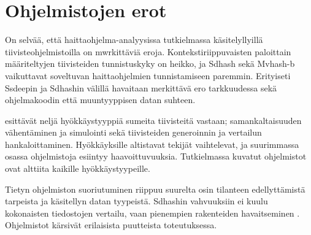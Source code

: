 \section{Ohjelmistojen erot}

On selvää, että haittaohjelma-analyysissa tutkielmassa käsitelyllyillä
tiivisteohjelmistoilla on mwrkittäviä eroja. Kontekstiriippuvaisten
paloittain määriteltyjen tiivisteiden tunnistuskyky on heikko, ja
Sdhash sekä Mvhash-b vaikuttavat soveltuvan haittaohjelmien tunnistamiseen
paremmin. Erityiseti Ssdeepin ja Sdhashin välillä havaitaan merkittävä
ero tarkkuudessa sekä ohjelmakoodin että muuntyyppisen datan suhteen.

\textcite{martin-perez21} esittävät neljä hyökkäystyyppiä
sumeita tiivisteitä vastaan; samankaltaisuuden vähentäminen
ja simulointi sekä tiivisteiden generoinnin ja vertailun
hankaloittaminen. Hyökkäyksille altistavat tekijät
vaihtelevat, ja suurimmassa osassa ohjelmistoja
esiintyy haavoittuvuuksia. Tutkielmassa
kuvatut ohjelmistot ovat alttiita kaikille
hyökkäystyypeille.

Tietyn ohjelmiston suoriutuminen riippuu suurelta osin tilanteen edellyttämistä
tarpeista ja käsitellyn datan tyypeistä. Sdhashin vahvuuksiin ei kuulu
kokonaisten tiedostojen vertailu, vaan pienempien rakenteiden
havaitseminen \parencite{breitinger12}. Ohjelmistot kärsivät
erilaisista puutteista toteutuksessa.

